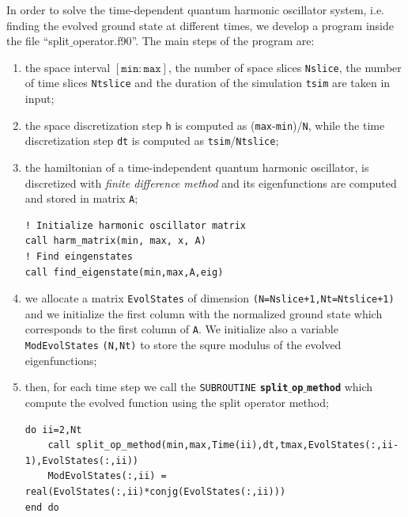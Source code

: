 \documentclass[rmp,10pt,onecolumn,fleqn,notitlepage]{revtex4-1}
\begin{document}
In order to solve the time-dependent quantum harmonic oscillator system, i.e. finding the evolved ground state at different times, we develop a program inside the file “split$\_$operator.f90”. The main steps of the program are:
\begin{enumerate}

\item the space interval $[\texttt{min}:\texttt{max}]$, the number of space slices \texttt{Nslice}, the number of time slices \texttt{Ntslice} and the duration of the simulation \texttt{tsim} are taken in input;

\item the space discretization step \texttt{h} is computed as (\texttt{max}-\texttt{min})/\texttt{N}, while the time discretization step \texttt{dt} is computed as \texttt{tsim}/\texttt{Ntslice};


\item the hamiltonian of a time-independent quantum harmonic oscillator, is discretized with \emph{finite difference method} and its eigenfunctions are computed and stored in matrix \texttt{A};

\begin{minipage}[t]{0.4\linewidth}%
\begin{lstlisting}[style=Fortran]
! Initialize harmonic oscillator matrix
call harm_matrix(min, max, x, A)
! Find eingenstates
call find_eigenstate(min,max,A,eig)\end{lstlisting}
\end{minipage}

\item we allocate a matrix \texttt{EvolStates} of dimension \texttt{(N=Nslice+1,Nt=Ntslice+1)} and we initialize the first column with the normalized ground state which corresponds to the first column of \texttt{A}. We initialize also a variable \texttt{ModEvolStates} \texttt{(N,Nt)} to store the squre modulus of the evolved eigenfunctions;

\item then, for each time step we call the \texttt{SUBROUTINE} {\bfseries\texttt{split$\_$op$\_$method}} which compute the evolved function using the split operator method;

\begin{minipage}[t]{0.9\linewidth}%
\begin{lstlisting}[style=Fortran]
do ii=2,Nt
    call split_op_method(min,max,Time(ii),dt,tmax,EvolStates(:,ii-1),EvolStates(:,ii))
    ModEvolStates(:,ii) = real(EvolStates(:,ii)*conjg(EvolStates(:,ii)))
end do\end{lstlisting}
\end{minipage}


\end{enumerate}
\end{document}
